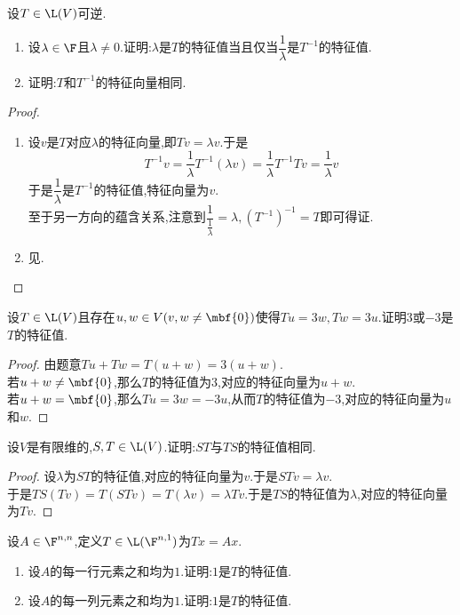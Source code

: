 \documentclass{ctexart}
\begin{document}
\begin{problem}[21.]
    设$T\in\L(V)$可逆.
    \begin{enumerate}[label=\tbf{(\arabic*)}]
        \item 设$\lambda\in\F$且$\lambda\neq0$.证明:$\lambda$是$T$的特征值当且仅当$\dfrac{1}{\lambda}$是$T^{-1}$的特征值.
        \item 证明:$T$和$T^{-1}$的特征向量相同.
    \end{enumerate}
\end{problem}
\begin{proof}
    \begin{enumerate}[label=\tbf{(\arabic*)}]
        \item 设$v$是$T$对应$\lambda$的特征向量,即$Tv=\lambda v$.于是
            $$T^{-1}v=\dfrac{1}{\lambda}T^{-1}(\lambda v)=\dfrac{1}{\lambda}T^{-1}Tv=\dfrac{1}{\lambda}v$$
            于是$\dfrac{1}{\lambda}$是$T^{-1}$的特征值,特征向量为$v$.\\
            至于另一方向的蕴含关系,注意到$\dfrac{1}{\frac{1}{\lambda}}=\lambda,\left(T^{-1}\right)^{-1}=T$即可得证.
        \item 见.
    \end{enumerate}
\end{proof}
\begin{problem}[22.]
    设$T\in\L(V)$且存在$u,w\in V(v,w\neq\mbf{0})$使得$Tu=3w,Tw=3u$.证明$3$或$-3$是$T$的特征值.
\end{problem}
\begin{proof}
    由题意$Tu+Tw=T(u+w)=3(u+w)$.\\
    若$u+w\neq\mbf{0}$,那么$T$的特征值为$3$,对应的特征向量为$u+w$.\\
    若$u+w=\mbf{0}$,那么$Tu=3w=-3u$,从而$T$的特征值为$-3$,对应的特征向量为$u$和$w$.
\end{proof}
\begin{problem}[23.]
    设$V$是有限维的,$S,T\in\L(V)$.证明:$ST$与$TS$的特征值相同.
\end{problem}
\begin{proof}
    设$\lambda$为$ST$的特征值,对应的特征向量为$v$.于是$STv=\lambda v$.\\
    于是$TS(Tv)=T(STv)=T(\lambda v)=\lambda Tv$.于是$TS$的特征值为$\lambda$,对应的特征向量为$Tv$.
\end{proof}
\begin{problem}[24.]
    设$A\in\F^{n,n}$,定义$T\in\L(\F^{n,1})$为$Tx=Ax$.
    \begin{enumerate}[label=\tbf{(\arabic*)}]
        \item 设$A$的每一行元素之和均为$1$.证明:$1$是$T$的特征值.
        \item 设$A$的每一列元素之和均为$1$.证明:$1$是$T$的特征值.
    \end{enumerate}
\end{problem}
\end{document}
